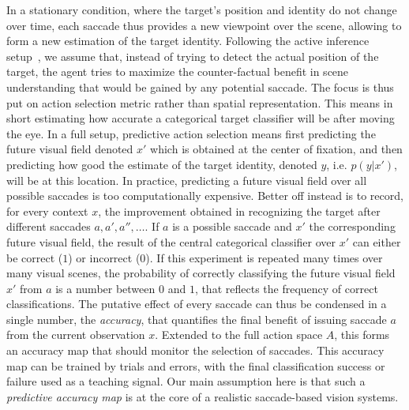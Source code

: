 In a stationary condition, where the target's position and identity do not change over time, each saccade thus provides a new viewpoint over the scene, allowing to form a new estimation of the target identity. Following the active inference setup~\cite{Najemnik05, Friston12}, we assume that, instead of trying to detect the actual position of the target, the agent tries to maximize the counter-factual benefit in scene understanding that would be gained by any potential saccade. The focus is thus put on action selection metric rather than spatial representation. This means in short estimating how accurate a categorical target classifier will be after moving the eye. In a full setup, predictive action selection means first predicting the future visual field denoted $x'$ which is obtained at the center of fixation, and then predicting how good the estimate of the target identity, denoted $y$, i.e. $p(y|x')$, will be at this location. In practice, predicting a future visual field over all possible saccades is too computationally expensive.  Better off instead is to record, for every context $x$, the improvement obtained in recognizing the target after different saccades $a, a', a'', \ldots$. If $a$ is a possible saccade and $x'$ the corresponding future visual field, the result of the central categorical classifier over $x'$ can either be correct ($1$) or incorrect ($0$). If this experiment is repeated many times over many visual scenes, the probability of correctly classifying the future visual field $x'$ from $a$ is a number between $0$ and $1$, that reflects the frequency of correct classifications. The putative effect of every saccade can thus be condensed in a single number, the \emph{accuracy}, that quantifies the final benefit of issuing saccade $a$ from the current observation $x$.  Extended to the full action space $A$, this forms an accuracy map that should monitor the selection of saccades. This accuracy map can be trained by trials and errors, with the final classification success or failure used as a teaching signal. Our main assumption here is that such a \emph{predictive accuracy map} is at the core of a realistic saccade-based vision systems.

